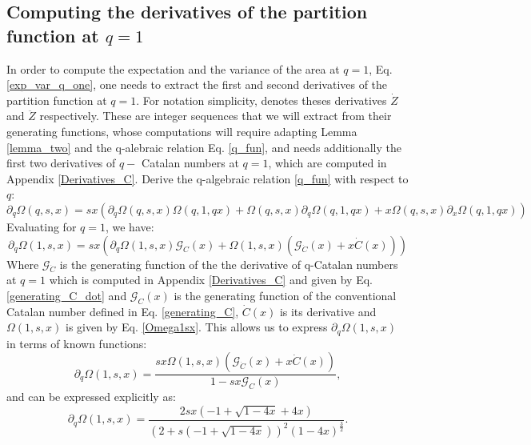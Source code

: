 \documentclass[pdflatex,sn-mathphys-num]{sn-jnl}
\theoremstyle{definition}
\theoremstyle{remark}
\numberwithin{equation}{section}
\begin{document}
\begin{appendices}

\section{Computing the  derivatives of the partition function at $q=1$}
\label{derivatives_Z}
In order to compute the expectation and the variance of the area at $q=1$, Eq. \ref{exp_var_q_one}, one needs to extract the first and second derivatives of the partition function at $q=1$. For notation simplicity, denotes theses derivatives $\dot{Z}$ and $\ddot{Z}$ respectively. These are integer sequences that we will extract from their generating functions, whose 
computations will require adapting Lemma \ref{lemma_two} and the q-alebraic relation Eq. \ref{q_fun}, and needs additionally the first two derivatives of $q-$ Catalan numbers at $q=1$, which are computed in Appendix \ref{Derivatives_C}. Derive the q-algebraic relation \ref{q_fun} with respect to $q$:
\begin{equation}
    \partial_q \Omega(q,s,x) =  s x(
    \partial_q \Omega(q,s,x) \Omega(q,1,q x)
    +
    \Omega(q,s,x) \partial_q \Omega(q,1,q x)
    +
    x \Omega(q,s,x) \partial_x  \Omega(q,1,q x)
    )
\end{equation}
Evaluating for $q=1$, we have:
\begin{equation}
\partial_q \Omega(1,s,x) =  s x(
    \partial_q \Omega(1,s,x) \mathcal{G}_{C}(x)
    +
    \Omega(1,s,x) (\mathcal{G}_{\dot{C}}(x)
    +
    x \dot{C}(x) )
    ) 
\end{equation}
Where $\mathcal{G}_{\dot{C}}$ is the generating function of the the derivative of q-Catalan numbers at $q=1$ which is computed in Appendix \ref{Derivatives_C} and given by Eq. \ref{generating_C_dot} and $\mathcal{G}_{C}(x)$ is the generating 
function of the conventional Catalan number defined in Eq. \ref{generating_C}, $\dot{C}(x)$ is its derivative and
 $\Omega(1,s,x)$ is given by Eq. \ref{Omega1sx}. This allows us to express $\partial_q \Omega(1,s,x)$ in terms of known functions:
\begin{equation}
    \partial_q \Omega(1,s,x) = \frac{s x \Omega(1,s,x) \left(\mathcal{G}_{\dot{C}}(x) + x \dot{C}(x) \right)}{1 - s x \mathcal{G}_{C}(x)},
\end{equation}
and can be expressed explicitly as:
\begin{equation}
    \partial_q \Omega(1,s,x) = \frac{2 s x (-1 + \sqrt{1 - 4 x} + 4 x)}{(2 + s (-1 + \sqrt{1 - 4 x}))^2 (1 - 4 x)^{\frac{3}{2}}}.
    \label{qOmega(1,s,x)}

\end{equation}
\end{appendices}
\end{document}
